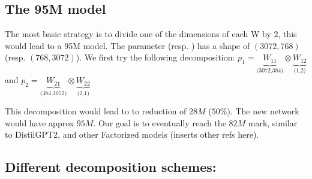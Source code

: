 \documentclass{article}
\begin{document}
\subsection{The 95M model}%
\label{sub:The 95M model}
The most basic strategy is to divide one of the dimensions of each W by 2, this would lead to a 95M model. The parameter  (resp. ) has a shape of $(3072, 768)$ (resp.  $(768, 3072)$). We first try the following decomposition: $p_1 = \underbrace{W_{11}}_{\text{(3072,384)}} \otimes \underbrace{W_{12}}_{\text{(1,2)}}$  and $p_2 = \underbrace{W_{21}}_{\text{(384,3072)}} \otimes \underbrace{W_{22}}_{\text{(2,1)}}$  


This decomposition would lead to to reduction of $28M$ ($50\%$). The new network would have approx $95M$. Our goal is to eventually reach the $82M$ mark, similar to DistilGPT2, and other Factorized models (inserts other refs here).

\subsection{Different decomposition schemes:}%
\label{sec:Different decomposition schemes}
\end{document}
